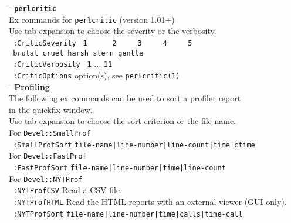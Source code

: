 \documentclass[oneside,10pt,landscape,DIV17]{scrartcl}
\begin{document}
\begin{multicols}{2}
\parbox[t][70mm][t]{120mm}{%
%
\begin{tabbing}
\hspace{30mm} \= \hspace{50mm} \= \kill
%
\textbf{\texttt{perlcritic}}\\[1.0ex]
%
Ex commands for \texttt{perlcritic} (version 1.01+)\\
Use tab expansion to choose the severity or the verbosity.\\[2.0ex]
\texttt{ :CriticSeverity}  \> \texttt{\ 1\ \ \ \ \ \ 2\ \ \ \ \ 3\ \ \ \ \ 4\ \ \ \ \ 5} \\
                           \> \texttt{\ brutal cruel harsh stern gentle} \\[1.0ex]
\texttt{ :CriticVerbosity} \> \texttt{\ 1} $\ldots$ \texttt{11}\\[1.0ex]
\texttt{ :CriticOptions}   \> option(s), see \texttt{perlcritic(1)}\\[5.5ex]
%
\hspace{30mm} \= \hspace{50mm} \= \kill
%
\large{\textbf{Profiling}}\\[1.0ex]
%
The following ex commands can be used to sort a profiler report \\in the quickfix window.\\
Use tab expansion to choose the sort criterion or the file name.\\[2.0ex]
%
For \texttt{Devel::SmallProf}\\[1.0ex]
\texttt{ :SmallProfSort}   \> \texttt{file-name|line-number|line-count|time|ctime}\\[3.0ex]
%
%
For \texttt{Devel::FastProf}\\[1.0ex]
\texttt{ :FastProfSort}    \> \texttt{file-name|line-number|time|line-count}\\[3.0ex]
%
%
For \texttt{Devel::NYTProf}\\[1.0ex]
\texttt{ :NYTProfCSV}      \> Read a CSV-file.\\[1.0ex]
%
\texttt{ :NYTProfHTML}      \> Read the HTML-reports with an external viewer (GUI only).\\[1.0ex]
%
%
\texttt{ :NYTProfSort}     \> \texttt{file-name|line-number|time|calls|time-call}\\
%
\end{tabbing}
}
\end{multicols}%
%
\end{document}
